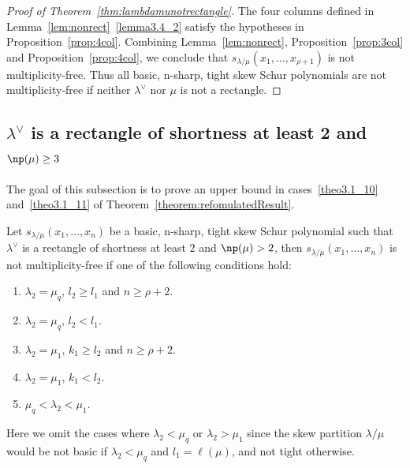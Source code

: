 
\begin{proof}[Proof of Theorem~\ref{thm:lambdamunotrectangle}] 
The four columns defined in Lemma~\ref{lem:nonrect}~\ref{lemma3.4_2} satisfy the hypotheses in Proposition~\ref{prop:4col}. Combining Lemma~\ref{lem:nonrect}, Proposition~\ref{prop:3col} and Proposition~\ref{prop:4col}, we conclude that $s_{\lambda/\mu}(x_1,\ldots,x_{\rho+1})$ is not multiplicity-free. Thus all basic, n-sharp, tight skew Schur polynomials are not multiplicity-free if neither $\lambda^\vee$ nor $\mu$ is not a rectangle.
\end{proof}

\subsection{\texorpdfstring{$\lambda^\vee$}{lambda vee} is a rectangle of shortness at least 2 and \texorpdfstring{$\np (\mu) \geq 3$}{np(mu) geq 3}}\label{sec:3.2}

The goal of this subsection is to prove an upper bound in cases~\ref{theo3.1_10} and~\ref{theo3.1_11} of Theorem~\ref{theorem:refomulatedResult}.

\begin{theorem}
\label{thm:suffnotfathook}
Let $s_{\lambda/\mu}(x_1,\ldots,x_n)$ be a basic, n-sharp, tight skew Schur polynomial such that $\lambda^\vee$ is a rectangle of shortness at least $2$ and $\np (\mu) > 2$, then $s_{\lambda/\mu}(x_1,\ldots,x_n)$ is not multiplicity-free if one of the following conditions hold:
\begin{enumerate}[label=(\Roman{*})]
 \item\label{theo3.9_1} $\lambda_2 = \mu_q$, $l_2\geq l_1$ and $n\geq \rho+2$.
 \item\label{theo3.9_2} $\lambda_2 = \mu_q$, $l_2< l_1$. 
 \item\label{theo3.9_3} $\lambda_2 = \mu_1$, $k_1\geq l_2$ and $n\geq \rho+2$.
 \item\label{theo3.9_4} $\lambda_2 = \mu_1$, $k_1< l_2$.
 \item\label{theo3.9_5} $\mu_q<\lambda_2<\mu_1$. 
\end{enumerate}
\end{theorem}

Here we omit the cases where $\lambda_2<\mu_q$ or $\lambda_2>\mu_1$ since the skew partition $\lambda/\mu$ would be not basic if $\lambda_2<\mu_q$ and $l_1 = \ell(\mu)$, and not tight otherwise. 

